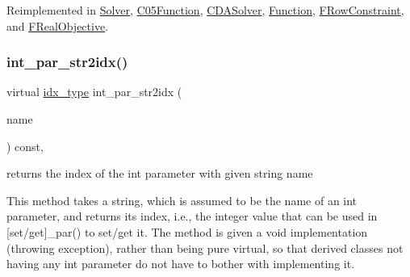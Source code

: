 Reimplemented in \mbox{\hyperlink{class_s_m_spp__di__unipi__it_1_1_solver_a61e973f39747f63b8f56d97cc62e32ce}{Solver}}, \mbox{\hyperlink{class_s_m_spp__di__unipi__it_1_1_c05_function_a61e973f39747f63b8f56d97cc62e32ce}{C05\+Function}}, \mbox{\hyperlink{class_s_m_spp__di__unipi__it_1_1_c_d_a_solver_a61e973f39747f63b8f56d97cc62e32ce}{C\+D\+A\+Solver}}, \mbox{\hyperlink{class_s_m_spp__di__unipi__it_1_1_function_a61e973f39747f63b8f56d97cc62e32ce}{Function}}, \mbox{\hyperlink{class_s_m_spp__di__unipi__it_1_1_f_row_constraint_a61e973f39747f63b8f56d97cc62e32ce}{F\+Row\+Constraint}}, and \mbox{\hyperlink{class_s_m_spp__di__unipi__it_1_1_f_real_objective_a61e973f39747f63b8f56d97cc62e32ce}{F\+Real\+Objective}}.

\mbox{\label{class_s_m_spp__di__unipi__it_1_1_thin_compute_interface_a69c6857c4288135135e8b6bbcf24252a}} 
\subsubsection{\texorpdfstring{int\+\_\+par\+\_\+str2idx()}{int\_par\_str2idx()}}
{\footnotesize\ttfamily virtual \mbox{\hyperlink{class_s_m_spp__di__unipi__it_1_1_thin_compute_interface_aa3d710629ad8c434286726ad810c3b47}{idx\+\_\+type}} int\+\_\+par\+\_\+str2idx (\begin{DoxyParamCaption}\item[{const std\+::string \&}]{name }\end{DoxyParamCaption}) const\hspace{0.3cm}{\ttfamily [inline]}, {\ttfamily [virtual]}}



returns the index of the int parameter with given string name 

This method takes a string, which is assumed to be the name of an int parameter, and returns its index, i.\+e., the integer value that can be used in \mbox{[}set/get\mbox{]}\+\_\+par() to set/get it. The method is given a void implementation (throwing exception), rather than being pure virtual, so that derived classes not having any int parameter do not have to bother with implementing it. 

